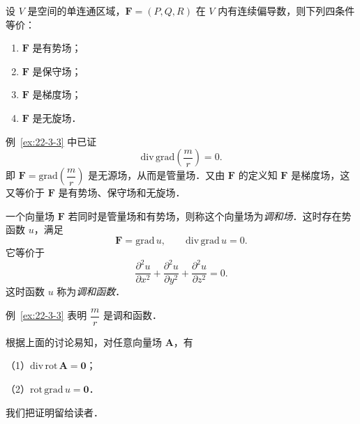 \begin{theorem}\label{thm:22-8}
设 $V$ 是空间的单连通区域，$\bm{F}=(P,Q,R)$ 在 $V$ 内有连续偏导数，则下列四条件等价：
\begin{enumerate}[label=（\arabic*）]
\item $\bm{F}$ 是有势场；
\item $\bm{F}$ 是保守场；
\item $\bm{F}$ 是梯度场；
\item $\bm{F}$ 是无旋场．
\end{enumerate}
\end{theorem}

例~\ref{ex:22-3-3} 中已证
\[
\mathrm{div}\,\mathrm{grad}\left(\frac{m}{r}\right)=0.
\]
即 $\bm{F}=\mathrm{grad}\left(\dfrac{m}{r}\right)$ 是无源场，从而是管量场．又由 $\bm{F}$ 的定义知 $\bm{F}$ 是梯度场，这又等价于 $\bm{F}$ 是有势场、保守场和无旋场．

一个向量场 $\bm{F}$ 若同时是管量场和有势场，则称这个向量场为\emph{调和场}．这时存在势函数 $u$，满足
\[
\bm{F}=\mathrm{grad}\,u,\qquad\mathrm{div}\,\mathrm{grad}\,u=0.
\]
它等价于
\[
\frac{\partial^{2}u}{\partial x^{2}}+\frac{\partial^{2}u}{\partial y^{2}}+\frac{\partial^{2}u}{\partial z^{2}}=0.
\]
这时函数 $u$ 称为\emph{调和函数}．

例~\ref{ex:22-3-3} 表明 $\dfrac{m}{r}$ 是调和函数．

根据上面的讨论易知，对任意向量场 $\bm{A}$，有

（1）$\mathrm{div}\,\mathrm{rot}\,\bm{A}=\bm{0}$；

（2）$\mathrm{rot}\,\mathrm{grad}\,u=\bm{0}$．

我们把证明留给读者．

